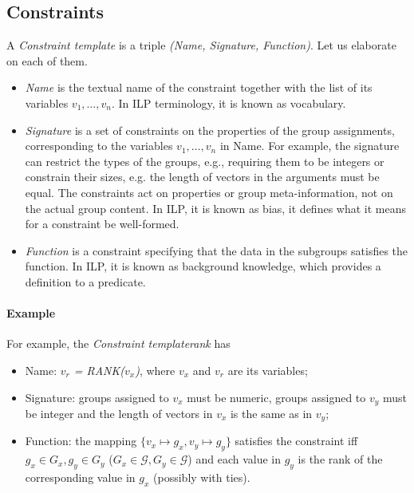 \documentclass{ecai}
\newcommand{\format}[1]{\textit{#1}\xspace}
\newcommand{\template}{\format{Constraint template}}
\newcommand{\CName}{Name\xspace}
\newcommand{\CSignature}{Signature\xspace}
\newcommand{\CFunction}{Function\xspace}
\newcommand{\groups}{\ensuremath{\mathcal{G}}\xspace}
\begin{document}
\subsection{Constraints}
A \template is a triple \textit{(\CName, \CSignature, \CFunction)}.
Let us elaborate on each of them. 
\begin{itemize}
\item
\textit{\CName} is the textual name of the constraint together with the list of its variables $v_1,\dots,v_n$.  In ILP terminology, it is known as vocabulary.
\item
  \textit{\CSignature} is a set of constraints on the properties of the group assignments, corresponding to the variables $v_1,\dots,v_n$ in \CName.
  For example, the signature can restrict the types of the groups, e.g., requiring them to be integers or constrain their sizes, e.g. the length of vectors in the arguments must be equal.
  The constraints act on properties or group meta-information, not on the actual group content. In ILP, it is known as bias, it defines what it means for a constraint be well-formed.
  \item \textit{\CFunction} is a constraint specifying that the data in the subgroups satisfies the function. In ILP, it is known as background knowledge, which provides a definition to a predicate.
\end{itemize}

\paragraph{Example}
  For example, the \template \textit{rank} has
\begin{itemize}
\item \CName: \textit{$v_r$ = RANK($v_x$)}, where $v_x$ and $v_r$ are its variables;
\item \CSignature: groups assigned to $v_x$ must be numeric, groups assigned to $v_y$ must be integer and the length of vectors in $v_x$ is the same as in $v_y$;
\item \CFunction: the mapping $\{ v_x \mapsto g_x, v_y \mapsto g_y \}$ satisfies the constraint iff $g_x \in G_x, g_y \in G_y$ ($G_x \in \groups, G_y \in \groups$) and each value in $g_y$ is the rank of the corresponding value in $g_x$ (possibly with ties).
\end{itemize}
\end{document}
